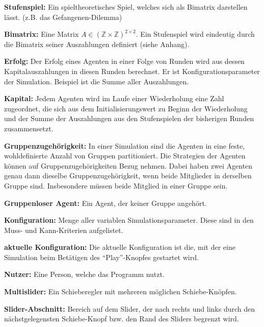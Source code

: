 \documentclass[parskip=full,11pt]{scrartcl}
\begin{document}
\textbf{Stufenspiel:}
Ein spieltheoretisches Spiel, welches sich als Bimatrix darstellen lässt. (z.B. das Gefangenen-Dilemma)

\textbf{Bimatrix:}
Eine Matrix \(A \in (\mathbb{Z} \times \mathbb{Z})^{2 \times 2}\). Ein Stufenspiel wird eindeutig durch die Bimatrix seiner Auszahlungen definiert (siehe Anhang).

\textbf{Erfolg:}
Der Erfolg eines Agenten in einer Folge von Runden wird aus dessen Kapitalauszahlungen in diesen Runden berechnet. Er ist Konfigurationsparameter der Simulation. Beispiel ist die Summe aller Auszahlungen.

\textbf{Kapital:}
Jedem Agenten wird im Laufe einer Wiederholung eine Zahl zugeordnet, die sich aus dem Initialisierungswert zu Beginn der Wiederholung und der Summe der Auszahlungen aus den Stufenspielen der bisherigen Runden zusammensetzt.

\textbf{Gruppenzugehörigkeit:}
In einer Simulation sind die Agenten in eine feste, wohldefinierte Anzahl von Gruppen partitioniert. Die Strategien der Agenten können auf Gruppenzugehörigkeiten Bezug nehmen. Dabei haben zwei Agenten genau dann dieselbe Gruppenzugehörigkeit, wenn beide Mitglieder in derselben Gruppe sind. Insbesondere müssen beide Mitglied in einer Gruppe sein.

\textbf{Gruppenloser Agent:}
Ein Agent, der keiner Gruppe angehört.

\textbf{Konfiguration:}
Menge aller variablen Simulationsparameter. Diese sind in den Muss- und Kann-Kriterien aufgelistet.

\textbf{aktuelle Konfiguration:}
Die aktuelle Konfiguration ist die, mit der eine Simulation beim Betätigen des \enquote{Play}-Knopfes gestartet wird.

\textbf{Nutzer:}
Eine Person, welche das Programm nutzt.

\textbf{Multislider:}
Ein Schieberegler mit mehreren möglichen Schiebe-Knöpfen.

\textbf{Slider-Abschnitt:}
Bereich auf dem Slider, der nach rechts und links durch den nächstgelegensten Schiebe-Knopf bzw. den Rand des Sliders begrenzt wird.
\end{document}
